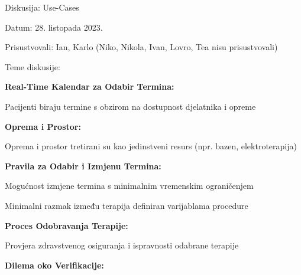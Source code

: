 \begin{packed_enum}
        \item Diskusija: Use-Cases
            \item[] \begin{packed_item}
                \item Datum: 28. listopada 2023.
                \item Prisustvovali: Ian, Karlo (Niko, Nikola, Ivan, Lovro, Tea nisu prisustvovali)
                \item Teme diskusije:
                    \begin{packed_item}
                        \item \textbf{Real-Time Kalendar za Odabir Termina:}
                            \begin{packed_item}
                                \item Pacijenti biraju termine s obzirom na dostupnost djelatnika i opreme
                            \end{packed_item}
                        \item \textbf{Oprema i Prostor:}
                            \begin{packed_item}
                                \item Oprema i prostor tretirani su kao jedinstveni resurs (npr. bazen, elektroterapija)
                            \end{packed_item}
                        \item \textbf{Pravila za Odabir i Izmjenu Termina:}
                            \begin{packed_item}
                                \item Mogućnost izmjene termina s minimalnim vremenskim ograničenjem
                                \item Minimalni razmak između terapija definiran varijablama procedure
                            \end{packed_item}
                        \item \textbf{Proces Odobravanja Terapije:}
                            \begin{packed_item}
                                \item Provjera zdravstvenog osiguranja i ispravnosti odabrane terapije
                            \end{packed_item}
                        \item \textbf{Dilema oko Verifikacije:}
                            \begin{packed_item}

\end{packed_item}
\end{packed_item}
\end{packed_item}
\end{packed_enum}
